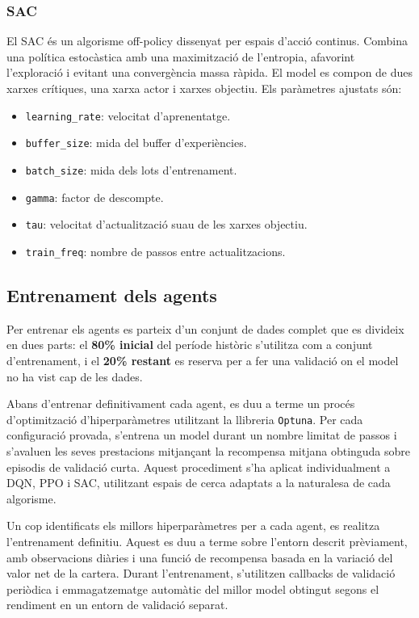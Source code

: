 \documentclass[12pt,a4paper,twoside]{book}
\begin{document}
\subsubsection{SAC}

El SAC és un algorisme off-policy dissenyat per espais d'acció continus. Combina una política estocàstica amb una maximització de l'entropia, afavorint l'exploració i evitant una convergència massa ràpida. El model es compon de dues xarxes crítiques, una xarxa actor i xarxes objectiu. Els paràmetres ajustats són:

\begin{itemize}
    \item \texttt{learning\_rate}: velocitat d'aprenentatge.
    \item \texttt{buffer\_size}: mida del buffer d'experiències.
    \item \texttt{batch\_size}: mida dels lots d'entrenament.
    \item \texttt{gamma}: factor de descompte.
    \item \texttt{tau}: velocitat d'actualització suau de les xarxes objectiu.
    \item \texttt{train\_freq}: nombre de passos entre actualitzacions.
\end{itemize}


\subsection{Entrenament dels agents}

Per entrenar els agents es parteix d'un conjunt de dades complet que es divideix en dues parts: el \textbf{80\% inicial} del període històric s'utilitza com a conjunt d'entrenament, i el \textbf{20\% restant} es reserva per a fer una validació on el model no ha vist cap de les dades.

Abans d'entrenar definitivament cada agent, es duu a terme un procés d'optimització d'hiperparàmetres utilitzant la llibreria \texttt{Optuna}. Per cada configuració provada, s'entrena un model durant un nombre limitat de passos i s'avaluen les seves prestacions mitjançant la recompensa mitjana obtinguda sobre episodis de validació curta. Aquest procediment s'ha aplicat individualment a DQN, PPO i SAC, utilitzant espais de cerca adaptats a la naturalesa de cada algorisme.

Un cop identificats els millors hiperparàmetres per a cada agent, es realitza l'entrenament definitiu. Aquest es duu a terme sobre l'entorn descrit prèviament, amb observacions diàries i una funció de recompensa basada en la variació del valor net de la cartera. Durant l'entrenament, s'utilitzen callbacks de validació periòdica i emmagatzematge automàtic del millor model obtingut segons el rendiment en un entorn de validació separat.
\end{document}
